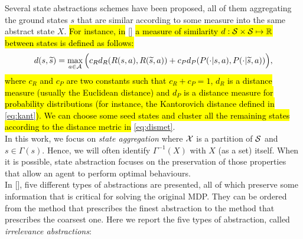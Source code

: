 \newline
Several state abstractions schemes have been proposed, all of them aggregating the ground states $s$ that are similar according to some measure into the same abstract state $X$. \hl{For instance, in} [\cite{ferns2012metrics}] \hl{a measure of similarity $d: \mathcal{S} \times \mathcal{S} \mapsto \mathbb{R}$ between states is defined as follows:}
\begin{align}
d(s, \widetilde{s}) = \max_{a \in \mathcal{A}} \Big( c_{R} d_{R}(R(s,a), R(\widetilde{s}, a)) + c_{P} d_{P}(P(\cdot|s, a), P(\cdot|\widetilde{s}, a)) \Big), \label{eq:dismet}
\end{align}
\hl{where $c_{R}$ and $c_{P}$ are two constants such that $c_{R} + c_{P} = 1$, $d_{R}$ is a distance measure (usually the Euclidean distance) and $d_{P}$ is a distance measure for probability distributions (for instance, the Kantorovich distance defined in} \ref{eq:kant}\hl{). We can choose some seed states and cluster all the remaining states according to the distance metric in} \ref{eq:dismet}.\\
\newline 
In this work, we focus on \textit{state aggregation} where $\mathcal{X}$ is a partition of $\mathcal{S}$ and $s\in\Gamma(s)$. Hence, we will often identify $\Gamma^{-1}(X)$ with $X$ (as a set) itself. When it is possible, state abstraction focuses on the preservation of those properties that allow an agent to perform optimal behaviours.\\
\newline
In [\cite{lihong2006towards}], five different types of abstractions are presented, all of which preserve some information that is critical for solving the original \ac{MDP}. They can be ordered from the method that prescribes the finest abstraction to the method that prescribes the coarsest one. Here we report the five types of abstraction, called \emph{irrelevance abstractions}:
